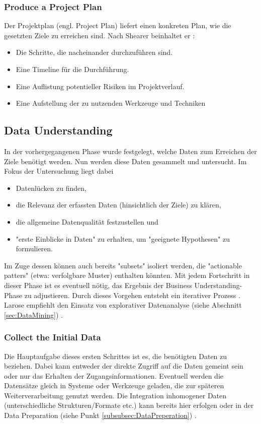 \subsubsection{Produce a Project Plan}
Der Projektplan (engl. Project Plan) liefert einen konkreten Plan, wie die gesetzten Ziele zu erreichen sind. Nach Shearer beinhaltet er \citep[S.~15]{shearer_crisp-dm_2000}:
\begin{itemize}
\item Die Schritte, die nacheinander durchzuführen sind.
\item Eine Timeline für die Durchführung.
\item Eine Auflistung potentieller Risiken im Projektverlauf.
\item Eine Aufstellung der zu nutzenden Werkzeuge und Techniken \citep[S.~16]{chapman_crisp-dm_2000}
\end{itemize}


\subsection{Data Understanding}
In der vorhergegangenen Phase wurde festgelegt, welche Daten zum Erreichen der Ziele benötigt werden. Nun werden diese Daten gesammelt und untersucht. Im Fokus der Untersuchung liegt dabei \citep[S.~73]{swamynathan_mastering_2017}
\begin{itemize}
\item Datenlücken zu finden,
\item die Relevanz der erfassten Daten (hinsichtlich der Ziele) zu klären,
\item die allgemeine Datenqualität festzustellen und
\item "erste Einblicke in Daten" zu erhalten, um "geeignete Hypothesen" \citep[S.~73; eigene Übersetzung]{swamynathan_mastering_2017} zu formulieren.
\end{itemize}
Im Zuge dessen können auch bereits "subsets" isoliert werden, die "actionable patters" \citep[Punkt 1.4.1.2.d]{larose_discovering_2014} (etwa: verfolgbare Muster) enthalten könnten. Mit jedem Fortschritt in dieser Phase ist es eventuell nötig, das Ergebnis der Business Understanding-Phase zu adjustieren. Durch dieses Vorgehen entsteht ein iterativer Prozess \citep[S.~73]{swamynathan_mastering_2017}. Larose empfiehlt den Einsatz von explorativer Datenanalyse (siehe Abschnitt \ref{sec:DataMining}) \citep[Punkt 1.4.1.2.b]{larose_discovering_2014}. 


\subsubsection{Collect the Initial Data}
Die Hauptaufgabe dieses ersten Schrittes ist es, die benötigten Daten zu beziehen. Dabei kann entweder der direkte Zugriff auf die Daten gemeint sein oder nur das Erhalten der Zugangsinformationen. Eventuell werden die Datensätze gleich in Systeme oder Werkzeuge geladen, die zur späteren Weiterverarbeitung genutzt werden. Die Integration inhomogener Daten (unterschiedliche Strukturen/Formate etc.) kann bereits hier erfolgen oder in der Data Preparation (siehe Punkt \ref{subsubsec:DataPreperation}) \citep[S.~18]{chapman_crisp-dm_2000}.

